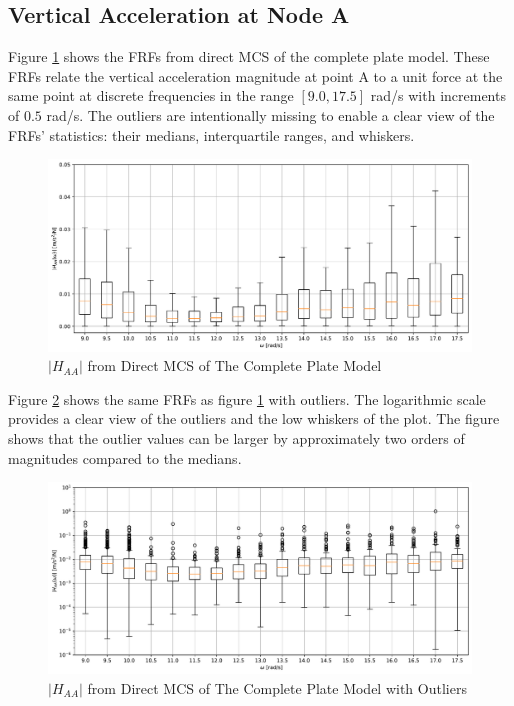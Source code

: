 %
%

\subsection{Vertical Acceleration at Node A}
\label{ssec: cms point A}

Figure \ref{FRF_MC_A_A_linear} shows the FRFs from direct MCS of the complete plate model.
These FRFs relate the vertical acceleration magnitude at point A to a unit force at the same point at discrete frequencies in the range $\left[9.0, 17.5\right]$ rad/s with increments of $0.5$ rad/s.
The outliers are intentionally missing to enable a clear view of the FRFs' statistics: their medians, interquartile ranges, and whiskers.
\begin{figure}[H]
    \centering
    \includegraphics[width=1.0\textwidth]{
        plots/substructuring/plot_1_linear.pdf
    }
    \caption{%
        $\left|H_{AA}\right|$ from Direct MCS of The Complete Plate Model
    }
    \label{FRF_MC_A_A_linear}
\end{figure}
Figure \ref{FRF_MC_A_A_log} shows the same FRFs as figure \ref{FRF_MC_A_A_linear} with outliers.
The logarithmic scale provides a clear view of the outliers and the low whiskers of the plot.
The figure shows that the outlier values can be larger by approximately two orders of magnitudes compared to the medians.
\begin{figure}[H]
    \centering
    \includegraphics[width=1.0\textwidth]{
        plots/substructuring/plot_1_log.pdf
    }
    \caption{%
        $\left|H_{AA}\right|$ from Direct MCS of The Complete Plate Model with Outliers
    }
    \label{FRF_MC_A_A_log}
\end{figure}
